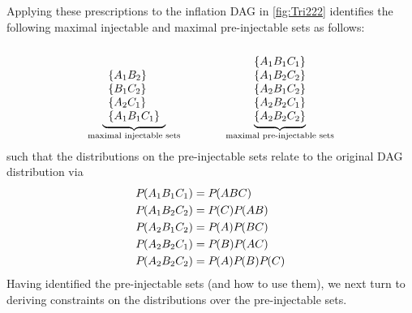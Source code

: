 
Applying these prescriptions to the inflation DAG in \cref{fig:Tri222} identifies the following 
maximal injectable and maximal pre-injectable sets as follows:
\begin{align}\label{eq:basicsetup222}
{\underbrace{\begin{array}{l}
\\ \\
\left\lbrace A_1 B_2\right\rbrace\\
\left\lbrace B_1 C_2\right\rbrace\\
\left\lbrace A_2 C_1\right\rbrace\\
\left\lbrace A_1 B_1 C_1\right\rbrace
\end{array}}_{\text{maximal injectable sets}}}
\qquad\qquad
{\underbrace{\begin{matrix}
\\
\left\lbrace A_1 B_1 C_1\right\rbrace \\
\left\lbrace A_1 B_2 C_2\right\rbrace \\
\left\lbrace A_2 B_1 C_2\right\rbrace \\
\left\lbrace A_2 B_2 C_1\right\rbrace \\
\left\lbrace A_2 B_2 C_2\right\rbrace
\end{matrix}}_{\text{maximal pre-injectable sets}}}
\end{align}
such that the distributions on the pre-injectable sets relate to the original DAG distribution via
\begin{align}\label{eq:preinjectableuses222}
\begin{split}
&{P_{}}\lparen A_1 B_1 C_1\rparen = {P_{}}\lparen A B C\rparen \\
&{P_{}}\lparen A_1 B_2 C_2\rparen = {P_{}}\lparen C\rparen{P_{}}\lparen A B\rparen\\
&{P_{}}\lparen A_2 B_1 C_2\rparen = {P_{}}\lparen A\rparen{P_{}}\lparen B C\rparen\\
&{P_{}}\lparen A_2 B_2 C_1\rparen = {P_{}}\lparen B\rparen{P_{}}\lparen A C\rparen\\
&{P_{}}\lparen A_2 B_2 C_2\rparen = {P_{}}\lparen A\rparen{P_{}}\lparen B\rparen{P_{}}\lparen C\rparen
\end{split}
\end{align}
Having identified the pre-injectable sets (and how to use them), we next turn to deriving constraints on the distributions over the pre-injectable sets.


